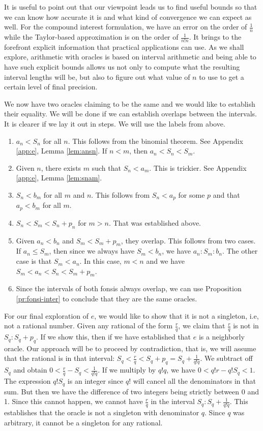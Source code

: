 \documentclass[12pt]{article}
\begin{document}
It is useful to point out that our viewpoint leads us to find useful bounds so that we can know how accurate it is and what kind of convergence we can expect as well. For the compound interest formulation, we have an error on the order of $\frac{1}{n}$ while the Taylor-based approximation is on the order of $\frac{1}{n! n}$. It brings to the forefront explicit information that practical applications can use. As we shall explore, arithmetic with oracles is based on interval arithmetic and being able to have such explicit bounds allows us not only to compute what the resulting interval lengths will be, but also to figure out what value of $n$ to use to get a certain level of final precision. 

We now have two oracles claiming to be the same and we would like to establish their equality. We will be done if we can establish overlaps between the intervals. It is clearer if we lay it out in steps. We will use the labels from above. 
\begin{enumerate}
    \item $a_n < S_n$ for all $n$. This follows from the binomial theorem. See Appendix \ref{app:e}, Lemma \ref{lem:ansn}. If $n < m$, then $a_n < S_n < S_m$.
    \item Given $n$, there exists $m$ such that $S_n < a_m$. This is trickier. See Appendix \ref{app:e}, Lemma \ref{lem:snam}. 
    \item $S_n < b_m$ for all $m$ and $n$. This follows from $S_n < a_p$ for some $p$ and that $a_p < b_m$ for all $m$.
    \item $S_n < S_m < S_n + p_n$ for $m > n$. That was established above. 
    \item Given $a_n < b_n$ and $S_m < S_m + p_m$, they overlap. This follows from two cases. If $a_n \leq S_m$, then since we always have $S_m < b_n$, we have $a_n : S_m : b_n$. The other case is that $S_m < a_n$. In this case, $m < n$ and we have $S_m < a_n < S_n < S_m + p_m$. 
    \item Since the intervals of both fonsis always overlap, we can use Proposition \ref{pr:fonsi-inter} to conclude that they are the same oracles. 
\end{enumerate}

For our final exploration of $e$, we would like to show that it is not a singleton, i.e, not a rational number. Given any rational of the form $\frac{r}{q}$, we claim that $\frac{r}{q}$ is not in $S_q : S_q + p_q$. If we show this, then if we have established that $e$ is a neighborly oracle. Our approach will be to proceed by contradiction, that is, we will assume that the rational is in that interval:  $S_q < \tfrac{r}{q} <  S_q + p_q = S_q + \frac{1}{q!q}$. We subtract off $S_q$ and obtain $0 < \tfrac{r}{q} - S_q < \tfrac{1}{q! q}$. If we multiply by $q! q$, we have $0 < q! r - q!S_q < 1$.  The expression $q! S_q$ is an integer since $q!$ will cancel all the denominators in that sum. But then we have the difference of two integers being strictly between 0 and 1. Since this cannot happen, we cannot have $\tfrac{r}{q}$ in the interval $S_q : S_q + \frac{1}{q! q}$. This establishes that the oracle is not a singleton with denominator $q$. Since $q$ was arbitrary, it cannot be a singleton for any rational. 
\end{document}
